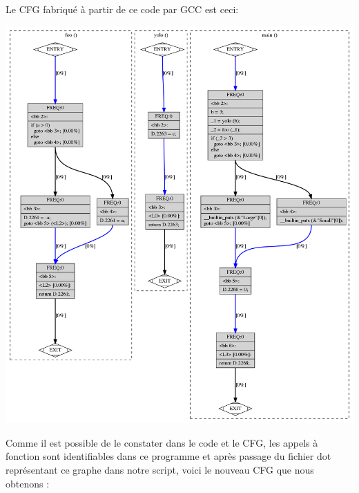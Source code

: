 \pagebreak
Le CFG fabriqué à partir de ce code par GCC est ceci:
\begin{center}
    \includegraphics[scale=0.32]{images/cfg_avant.png}
\end{center}
Comme il est possible de le constater dans le code et le CFG, les appels à fonction sont identifiables dans ce programme et après passage du fichier dot représentant ce graphe dans notre script, voici le nouveau CFG que nous obtenons :
